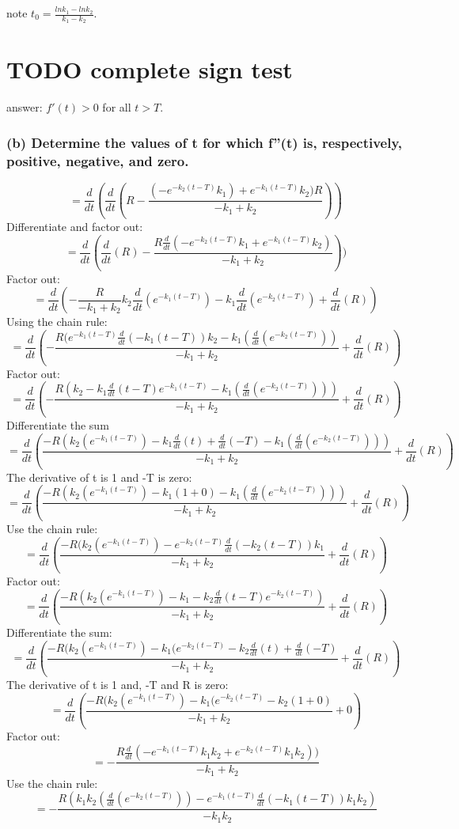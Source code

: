 \documentclass[]{article}
\begin{document}
note \(t_0 = \frac{ln k_1 - ln k_2}{k_1 - k_2}\).

\section{TODO complete sign test}\label{todo-complete-sign-test-1}

answer: \(f'(t) > 0\) for all \(t > T\).

\subsubsection{(b) Determine the values of t for which f''(t) is,
respectively, positive, negative, and
zero.}\label{b-determine-the-values-of-t-for-which-ft-is-respectively-positive-negative-and-zero.}

\[=\frac{d}{dt}(\frac{d}{dt}(R - \frac{(-e^{-k_2(t-T)}k_1) + e^{-k_1(t-T)}k_2)R}{-k_1+k_2}))\]
Differentiate and factor out:
\[=\frac{d}{dt}(\frac{d}{dt}(R) - \frac{R \frac{d}{dt}(-e^{-k_2(t-T)}k_1 + e^{-k_1(t-T)}k_2)}{-k_1+k_2}))\]
Factor out:
\[=\frac{d}{dt}(-\frac{R}{-k_1 + k_2}k_2\frac{d}{dt}(e^{-k_1(t-T)})-k_1\frac{d}{dt}(e^{-k_2(t-T)})+\frac{d}{dt}(R))\]
Using the chain rule:
\[=\frac{d}{dt}(-\frac{R(e^{-k_1(t-T)}\frac{d}{dt}(-k_1(t-T))k_2 - k_1(\frac{d}{dt}(e^{-k_2(t-T)}))}{-k_1 +k_2}+\frac{d}{dt}(R))\]
Factor out:
\[= \frac{d}{dt}(-\frac{R(k_2-k_1 \frac{d}{dt}(t-T)e^{-k_1(t-T)}-k_1( \frac{d}{dt}(e^{-k_2(t-T)})))}{-k_1+k_2} + \frac{d}{dt}(R))\]
Differentiate the sum
\[=\frac{d}{dt}(\frac{-R(k_2(e^{-k_1(t-T)})-k_1\frac{d}{dt}(t)+\frac{d}{dt}(-T)-k_1(\frac{d}{dt}(e^{-k_2(t-T)})))}{-k_1+k_2}+\frac{d}{dt}(R))\]
The derivative of t is 1 and -T is zero:
\[=\frac{d}{dt}(\frac{-R(k_2(e^{-k_1(t-T)})-k_1(1+0)-k_1(\frac{d}{dt}(e^{-k_2(t-T)})))}{-k_1+k_2}+\frac{d}{dt}(R))\]
Use the chain rule:
\[=\frac{d}{dt}(\frac{-R(k_2(e^{-k_1(t-T)})-e^{-k_2(t-T)}\frac{d}{dt}(-k_2(t-T))k_1 }{-k_1+k_2}+\frac{d}{dt}(R))\]
Factor out:
\[=\frac{d}{dt}(\frac{-R(k_2(e^{-k_1(t-T)})-k_1-k_2\frac{d}{dt}(t-T)e^{-k_2(t-T)})  }{-k_1+k_2}+\frac{d}{dt}(R))\]
Differentiate the sum:
\[=\frac{d}{dt}(\frac{-R(k_2(e^{-k_1(t-T)})-k_1(e^{-k_2(t-T)}-k_2\frac{d}{dt}(t)+\frac{d}{dt}(-T)}{-k_1+k_2}+\frac{d}{dt}(R))\]
The derivative of t is 1 and, -T and R is zero:
\[=\frac{d}{dt}(\frac{-R(k_2(e^{-k_1(t-T)})-k_1(e^{-k_2(t-T)}-k_2(1+0)}{-k_1+k_2}+0)\]
Factor out:
\[=-\frac{R\frac{d}{dt}(-e^{-k_1(t-T)}k_1 k_2 + e^{-k_2(t-T)}k_1 k_2))}{-k_1 + k_2}\]
Use the chain rule:
\[=-\frac{R(k_1 k_2(\frac{d}{dt}(e^{-k_2(t-T)}))-e^{-k_1(t-T)}\frac{d}{dt}(-k_1(t-T))k_1 k_2)}{-k_1 k_2}\]
\end{document}
